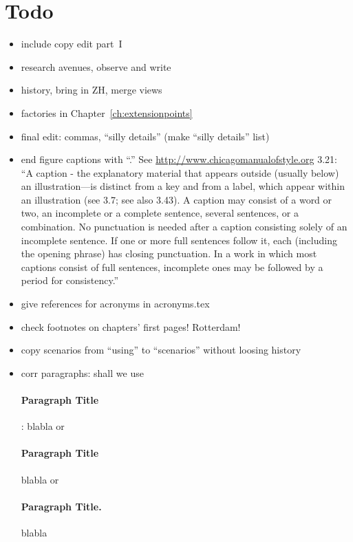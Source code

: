 \section*{Todo}

\begin{itemize}\styleItemize

\item include copy edit part~I

\item research avenues, observe and write

\item history, bring in ZH, merge views

\item factories in Chapter~\ref{ch:extensionpoints}

\item final edit: commas, ``silly details'' (make ``silly details'' list)

\item end figure captions with ``.'' See \url{http://www.chicagomanualofstyle.org} 3.21: ``A caption - the explanatory material that appears outside (usually below) an illustration—is distinct from a key and from a label, which appear within an illustration (see 3.7; see also 3.43). A caption may consist of a word or two, an incomplete or a complete sentence, several sentences, or a combination. No punctuation is needed after a caption consisting solely of an incomplete sentence. If one or more full sentences follow it, each (including the opening phrase) has closing punctuation. In a work in which most captions consist of full sentences, incomplete ones may be followed by a period for consistency.''

\item give references for acronyms in acronyms.tex

\item check footnotes on chapters' first pages! Rotterdam!

\item copy scenarios from ``using'' to ``scenarios'' without loosing history

\item corr paragraphs: shall we use \paragraph{Paragraph Title}: blabla or \paragraph{Paragraph Title} blabla or \paragraph{Paragraph Title.} blabla


\end{itemize}
